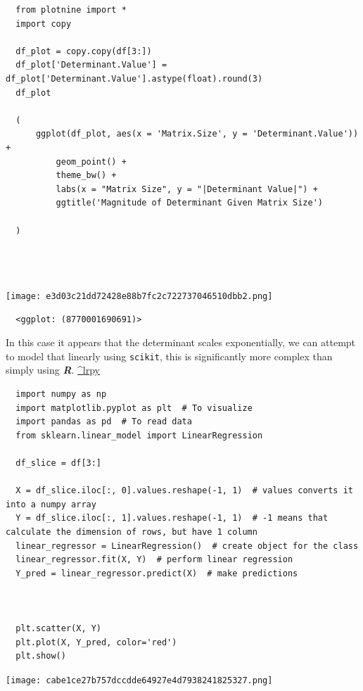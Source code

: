 \documentclass[11pt]{article}
\begin{document}
\begin{verbatim}
  from plotnine import *
  import copy

  df_plot = copy.copy(df[3:])
  df_plot['Determinant.Value'] = df_plot['Determinant.Value'].astype(float).round(3)
  df_plot

  (
      ggplot(df_plot, aes(x = 'Matrix.Size', y = 'Determinant.Value')) +
          geom_point() +
          theme_bw() +
          labs(x = "Matrix Size", y = "|Determinant Value|") +
          ggtitle('Magnitude of Determinant Given Matrix Size')

  )




\end{verbatim}

\begin{center}
\texttt{[image: e3d03c21dd72428e88b7fc2c722737046510dbb2.png]}
\end{center}

\begin{verbatim}
  <ggplot: (8770001690691)>
\end{verbatim}

In this case it appears that the determinant scales exponentially, we
can attempt to model that linearly using \texttt{scikit}, this is significantly
more complex than simply using \textbf{\emph{R}}.
\href{https://towardsdatascience.com/linear-regression-in-6-lines-of-python-5e1d0cd05b8d}{\^{}lrpy}

\begin{verbatim}
  import numpy as np
  import matplotlib.pyplot as plt  # To visualize
  import pandas as pd  # To read data
  from sklearn.linear_model import LinearRegression

  df_slice = df[3:]

  X = df_slice.iloc[:, 0].values.reshape(-1, 1)  # values converts it into a numpy array
  Y = df_slice.iloc[:, 1].values.reshape(-1, 1)  # -1 means that calculate the dimension of rows, but have 1 column
  linear_regressor = LinearRegression()  # create object for the class
  linear_regressor.fit(X, Y)  # perform linear regression
  Y_pred = linear_regressor.predict(X)  # make predictions



  plt.scatter(X, Y)
  plt.plot(X, Y_pred, color='red')
  plt.show()
\end{verbatim}

\begin{center}
\texttt{[image: cabe1ce27b757dccdde64927e4d7938241825327.png]}
\end{center}
\end{document}
